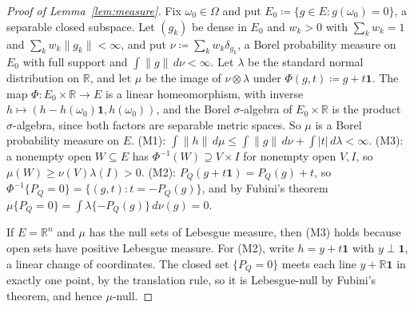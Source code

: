 \documentclass[11pt]{article}
\newcommand{\R}{\mathbb{R}}
\newcommand{\one}{\mathbf{1}}
\theoremstyle{plain}
\theoremstyle{definition}
\theoremstyle{remark}
\begin{document}
\begin{proof}[Proof of Lemma~\ref{lem:measure}]
Fix $\omega_0\in\Omega$ and put $E_0\coloneqq\{g\in E:g(\omega_0)=0\}$, a separable closed
subspace. Let $(g_k)$ be dense in $E_0$ and $w_k>0$ with $\sum_kw_k=1$ and $\sum_kw_k\|g_k\|<
\infty$, and put $\nu\coloneqq\sum_kw_k\delta_{g_k}$, a Borel probability measure on $E_0$ with
full support and $\int\|g\|\,d\nu<\infty$. Let $\lambda$ be the standard normal distribution on
$\R$, and let $\mu$ be the image of $\nu\otimes\lambda$ under $\Phi(g,t)\coloneqq g+t\one$. The
map $\Phi:E_0\times\R\to E$ is a linear homeomorphism, with inverse $h\mapsto(h-h(\omega_0)
\one,h(\omega_0))$, and the Borel $\sigma$-algebra of $E_0\times\R$ is the product
$\sigma$-algebra, since both factors are separable metric spaces. So $\mu$ is a Borel
probability measure on $E$. (M1): $\int\|h\|\,d\mu\le\int\|g\|\,d\nu+\int|t|\,d\lambda<\infty$.
(M3): a nonempty open $W\subseteq E$ has $\Phi^{-1}(W)\supseteq V\times I$ for nonempty open
$V,I$, so $\mu(W)\ge\nu(V)\lambda(I)>0$. (M2): $P_Q(g+t\one)=P_Q(g)+t$, so $\Phi^{-1}\{P_Q=0\}
=\{(g,t):t=-P_Q(g)\}$, and by Fubini's theorem $\mu\{P_Q=0\}=\int\lambda\{-P_Q(g)\}\,d\nu(g)=0$.

If $E=\R^n$ and $\mu$ has the null sets of Lebesgue measure, then (M3) holds because open sets
have positive Lebesgue measure. For (M2), write $h=y+t\one$ with $y\perp\one$, a linear change
of coordinates. The closed set $\{P_Q=0\}$ meets each line $y+\R\one$ in exactly one point, by
the translation rule, so it is Lebesgue-null by Fubini's theorem, and hence $\mu$-null.
\end{proof}
\end{document}
